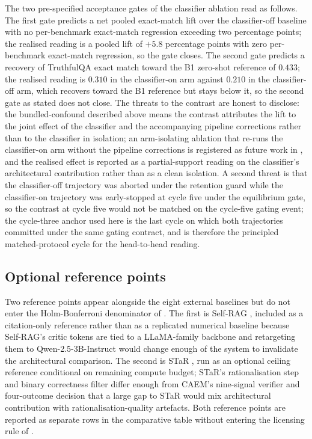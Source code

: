 The two pre-specified acceptance gates of the classifier ablation read as follows. The first gate predicts a net pooled exact-match lift over the classifier-off baseline with no per-benchmark exact-match regression exceeding two percentage points; the realised reading is a pooled lift of $+5.8$ percentage points with zero per-benchmark exact-match regression, so the gate closes. The second gate predicts a recovery of TruthfulQA exact match toward the B1 zero-shot reference of $0.433$; the realised reading is $0.310$ in the classifier-on arm against $0.210$ in the classifier-off arm, which recovers toward the B1 reference but stays below it, so the second gate as stated does not close. The threats to the contrast are honest to disclose: the bundled-confound described above means the contrast attributes the lift to the joint effect of the classifier and the accompanying pipeline corrections rather than to the classifier in isolation; an arm-isolating ablation that re-runs the classifier-on arm without the pipeline corrections is registered as future work in , and the realised effect is reported as a partial-support reading on the classifier's architectural contribution rather than as a clean isolation. A second threat is that the classifier-off trajectory was aborted under the retention guard while the classifier-on trajectory was early-stopped at cycle five under the equilibrium gate, so the contrast at cycle five would not be matched on the cycle-five gating event; the cycle-three anchor used here is the last cycle on which both trajectories committed under the same gating contract, and is therefore the principled matched-protocol cycle for the head-to-head reading.

\subsection{Optional reference points}
\label{sec:comp-references}

Two reference points appear alongside the eight external baselines but do not enter the Holm-Bonferroni denominator of . The first is Self-RAG \cite{asai2024selfrag}, included as a citation-only reference rather than as a replicated numerical baseline because Self-RAG's critic tokens are tied to a LLaMA-family backbone and retargeting them to Qwen-2.5-3B-Instruct would change enough of the system to invalidate the architectural comparison. The second is STaR \cite{NEURIPS2022_639a9a17}, run as an optional ceiling reference conditional on remaining compute budget; STaR's rationalisation step and binary correctness filter differ enough from CAEM's nine-signal verifier and four-outcome decision that a large gap to STaR would mix architectural contribution with rationalisation-quality artefacts. Both reference points are reported as separate rows in the comparative table without entering the licensing rule of .

